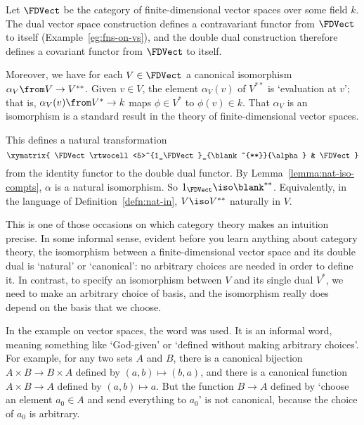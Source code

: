 \begin{example}
Let $\FDVect$%
%
%
be the category of finite-dimensional vector spaces over some field $k$.
The dual%
%
%
%
vector space construction defines a contravariant functor from $\FDVect$ to
itself (Example~\ref{eg:fns-on-vs}), and the double dual construction
therefore defines a covariant functor from $\FDVect$ to itself.

Moreover, we have for each $V \in \FDVect$ a canonical isomorphism
$\alpha_V\from V \to V^{**}$.  Given $v \in V$, the element $\alpha_V(v)$
of $V^{**}$ is `evaluation%
%
%
at $v$'; that is, $\alpha_V(v)\from V^* \to k$ maps $\phi \in V^*$ to
$\phi(v) \in k$.  That $\alpha_V$ is an isomorphism is a standard result in
the theory of finite-dimensional vector spaces.

This defines a natural transformation
\[
\xymatrix{
\FDVect 
\rtwocell<5>^{1_\FDVect}_{\blank^{**}}{\alpha} &
\FDVect
}
\]
from the identity functor to the double dual functor.  By
Lemma~\ref{lemma:nat-iso-compts}, $\alpha$ is a natural isomorphism.  So
$1_\FDVect \iso \blank^{**}$.  Equivalently, in the language of
Definition~\ref{defn:nat-in}, $V \iso V^{**}$ naturally in $V$.

This is one of those occasions on which category theory makes an intuition
precise.  In some informal sense, evident before you learn anything about
category theory, the isomorphism between a finite-dimensional vector space
and its double dual is `natural' or `canonical': no arbitrary choices are
needed in order to define it.  In contrast, to specify an isomorphism
between $V$ and its single dual $V^*$, we need to make an arbitrary choice
of basis, and the isomorphism really does depend on the basis that we
choose.
\end{example}

In the example on vector spaces, the word %
%
%
was used.  It is an informal word, meaning something like `God-given' or
`defined without making arbitrary choices'.  For example, for any two sets
$A$ and $B$, there is a canonical bijection $A \times B \to B \times A$
defined by $(a, b) \mapsto (b, a)$, and there is a canonical function $A
\times B \to A$ defined by $(a, b) \mapsto a$.  But the function $B \to A$
defined by `choose an element $a_0 \in A$ and send everything to $a_0$' is
not canonical, because the choice of $a_0$ is arbitrary.

\subjectchange

